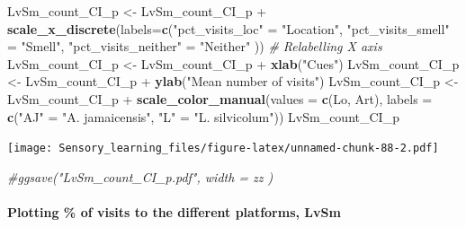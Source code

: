 \documentclass[]{article}
\newenvironment{Shaded}{\begin{snugshade}}{\end{snugshade}}
\newcommand{\KeywordTok}[1]{\textcolor[rgb]{0.13,0.29,0.53}{\textbf{{#1}}}}
\newcommand{\DataTypeTok}[1]{\textcolor[rgb]{0.13,0.29,0.53}{{#1}}}
\newcommand{\StringTok}[1]{\textcolor[rgb]{0.31,0.60,0.02}{{#1}}}
\newcommand{\CommentTok}[1]{\textcolor[rgb]{0.56,0.35,0.01}{\textit{{#1}}}}
\newcommand{\NormalTok}[1]{{#1}}
\let\oldparagraph\paragraph
\renewcommand{\paragraph}[1]{\oldparagraph{#1}\mbox{}}
\begin{document}
\begin{Shaded}
\begin{Highlighting}[]
\NormalTok{LvSm_count_CI_p <-}\StringTok{ }\NormalTok{LvSm_count_CI_p +}\StringTok{ }\KeywordTok{scale_x_discrete}\NormalTok{(}\DataTypeTok{labels=}\KeywordTok{c}\NormalTok{(}\StringTok{"pct_visits_loc"} \NormalTok{=}\StringTok{ "Location"}\NormalTok{, }\StringTok{"pct_visits_smell"} \NormalTok{=}\StringTok{ "Smell"}\NormalTok{,}
                              \StringTok{"pct_visits_neither"} \NormalTok{=}\StringTok{ "Neither"} \NormalTok{))  }\CommentTok{# Relabelling X axis}
\NormalTok{LvSm_count_CI_p <-}\StringTok{ }\NormalTok{LvSm_count_CI_p +}\StringTok{ }\KeywordTok{xlab}\NormalTok{(}\StringTok{"Cues"}\NormalTok{)}
\NormalTok{LvSm_count_CI_p <-}\StringTok{ }\NormalTok{LvSm_count_CI_p +}\StringTok{ }\KeywordTok{ylab}\NormalTok{(}\StringTok{"Mean number of visits"}\NormalTok{)}
\NormalTok{LvSm_count_CI_p <-}\StringTok{ }\NormalTok{LvSm_count_CI_p +}\StringTok{ }\KeywordTok{scale_color_manual}\NormalTok{(}\DataTypeTok{values =} \KeywordTok{c}\NormalTok{(Lo, Art), }\DataTypeTok{labels =} \KeywordTok{c}\NormalTok{(}\StringTok{"AJ"} \NormalTok{=}\StringTok{ "A. jamaicensis"}\NormalTok{, }\StringTok{"L"} \NormalTok{=}\StringTok{ "L. silvicolum"}\NormalTok{))}
\NormalTok{LvSm_count_CI_p }
\end{Highlighting}
\end{Shaded}

\texttt{[image: Sensory\_learning\_files/figure-latex/unnamed-chunk-88-2.pdf]}

\begin{Shaded}
\begin{Highlighting}[]
\CommentTok{#ggsave("LvSm_count_CI_p.pdf", width = zz  )}
\end{Highlighting}
\end{Shaded}

\paragraph{Plotting \% of visits to the different platforms,
LvSm}\label{plotting-of-visits-to-the-different-platforms-lvsm-2}
\end{document}
